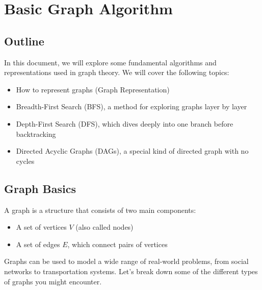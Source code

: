 
\chapter{Basic Graph Algorithm}

\section{Outline}
In this document, we will explore some fundamental algorithms and representations used in graph theory. We will cover the following topics:
\begin{itemize}
    \item How to represent graphs (Graph Representation)
    \item Breadth-First Search (BFS), a method for exploring graphs layer by layer
    \item Depth-First Search (DFS), which dives deeply into one branch before backtracking
    \item Directed Acyclic Graphs (DAGs), a special kind of directed graph with no cycles
\end{itemize}

\section{Graph Basics}
A graph is a structure that consists of two main components:
\begin{itemize}
    \item A set of vertices $V$ (also called nodes)
    \item A set of edges $E$, which connect pairs of vertices
\end{itemize}

Graphs can be used to model a wide range of real-world problems, from social networks to transportation systems. Let's break down some of the different types of graphs you might encounter.

